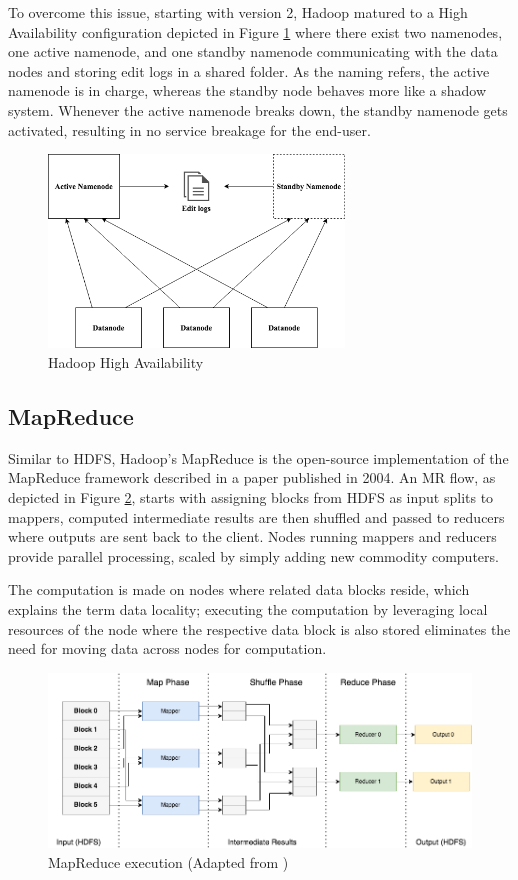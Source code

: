 \documentclass[review]{elsarticle}
\begin{document}
To overcome this issue, starting with version 2, Hadoop matured to a High Availability configuration depicted in Figure \ref{fig:HadoopHA} where there exist two namenodes, one active namenode, and one standby namenode communicating with the data nodes and storing edit logs in a shared folder. As the naming refers, the active namenode is in charge, whereas the standby node behaves more like a shadow system. Whenever the active namenode breaks down, the standby namenode gets activated, resulting in no service breakage for the end-user.

\begin{figure}[h!]
	\caption{Hadoop High Availability}
	\label{fig:HadoopHA}
	\includegraphics[width=0.7\textwidth]{HadoopHA}
	\centering
\end{figure}

\subsection{MapReduce}\label{MapReduce}
Similar to HDFS, Hadoop's MapReduce is the open-source implementation of the MapReduce framework described in a paper \cite{dean_mapreduce_2004} published in 2004. An MR flow, as depicted in Figure \ref{fig:MapReduce}, starts with assigning blocks from HDFS as input splits to mappers, computed intermediate results are then shuffled and passed to reducers where outputs are sent back to the client. Nodes running mappers and reducers provide parallel processing, scaled by simply adding new commodity computers. 

The computation is made on nodes where related data blocks reside, which explains the term data locality; executing the computation by leveraging local resources of the node where the respective data block is also stored eliminates the need for moving data across nodes for computation.

\begin{figure}[h!]
	\caption{MapReduce execution (Adapted from \cite{schatzle_giant_nodate})}
	\label{fig:MapReduce}
	\includegraphics[width=\textwidth]{MapReduce}
	\centering
\end{figure}
\end{document}
